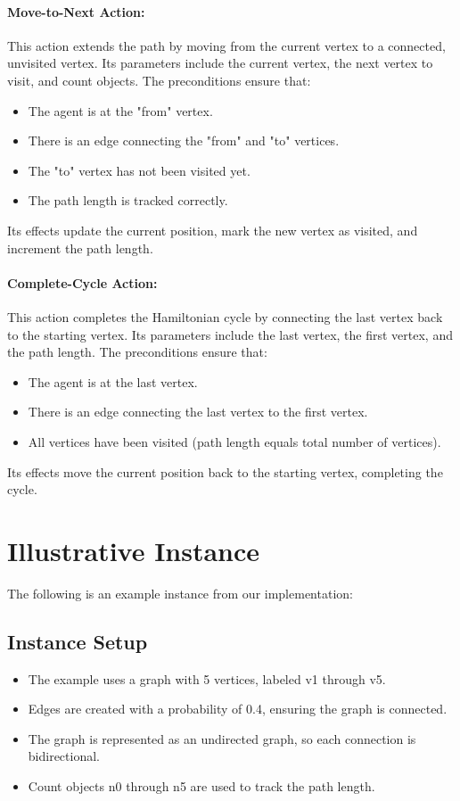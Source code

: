 \documentclass[a4paper,11pt]{article}
\begin{document}
\paragraph{Move-to-Next Action:}  
This action extends the path by moving from the current vertex to a connected, unvisited vertex. Its parameters include the current vertex, the next vertex to visit, and count objects. The preconditions ensure that:
\begin{itemize}
    \item The agent is at the "from" vertex.
    \item There is an edge connecting the "from" and "to" vertices.
    \item The "to" vertex has not been visited yet.
    \item The path length is tracked correctly.
\end{itemize}
Its effects update the current position, mark the new vertex as visited, and increment the path length.

\paragraph{Complete-Cycle Action:}  
This action completes the Hamiltonian cycle by connecting the last vertex back to the starting vertex. Its parameters include the last vertex, the first vertex, and the path length. The preconditions ensure that:
\begin{itemize}
    \item The agent is at the last vertex.
    \item There is an edge connecting the last vertex to the first vertex.
    \item All vertices have been visited (path length equals total number of vertices).
\end{itemize}
Its effects move the current position back to the starting vertex, completing the cycle.

\section{Illustrative Instance}
The following is an example instance from our implementation:

\subsection{Instance Setup}
\begin{itemize}
    \item The example uses a graph with 5 vertices, labeled v1 through v5.
    \item Edges are created with a probability of 0.4, ensuring the graph is connected.
    \item The graph is represented as an undirected graph, so each connection is bidirectional.
    \item Count objects n0 through n5 are used to track the path length.
\end{itemize}
\end{document}
